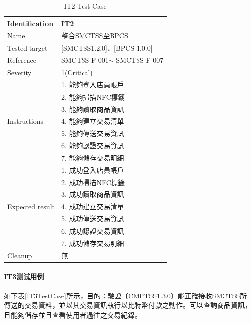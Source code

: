 				\begin{table}[htbp]
				\caption{IT2 Test Case} %
				\centering %
				\label{IT2TestCase} %
				\begin{tabular}{|l|l|}
				\hline
				Identification & IT2 \\ \hline
				Name & 整合SMCTSS至BPCS \\ \hline
				Tested target & {[}SMCTSS1.2.0{]}、{[}BPCS 1.0.0{]} \\ \hline
				Reference & SMCTSS-F-001$\sim$ SMCTSS-F-007 \\ \hline
				Severity & 1(Critical) \\ \hline
				\multirow{7}{*}{Instructions} & 1.     能夠登入店員帳戶 \\ \cline{2-2} 
				 & 2.     能夠掃描NFC標籤 \\ \cline{2-2} 
				 & 3.     能夠讀取商品資訊 \\ \cline{2-2} 
				 & 4.     能夠建立交易清單 \\ \cline{2-2} 
				 & 5.     能夠傳送交易資訊 \\ \cline{2-2} 
				 & 6.     能夠認證交易資訊 \\ \cline{2-2} 
				 & 7.     能夠儲存交易明細 \\ \hline
				\multirow{7}{*}{Expected result} & 1.     成功登入店員帳戶 \\ \cline{2-2} 
				 & 2.     成功掃描NFC標籤 \\ \cline{2-2} 
				 & 3.     成功讀取商品資訊 \\ \cline{2-2} 
				 & 4.     成功建立交易清單 \\ \cline{2-2} 
				 & 5.     成功傳送交易資訊 \\ \cline{2-2} 
				 & 6.     成功認證交易資訊 \\ \cline{2-2} 
				 & 7.     成功儲存交易明細 \\ \hline
				Cleanup & 無 \\ \hline
				\end{tabular}
				\end{table}

			\paragraph{IT3测试用例}
				如下表\ref{IT3TestCase}所示，目的：驗證〔CMPTSS1.3.0〕能正確接收SMCTSS所傳送的交易資料，並以其交易資訊執行以比特幣付款之動作。可以查詢商品資訊，且能夠儲存並且查看使用者過往之交易紀錄。


